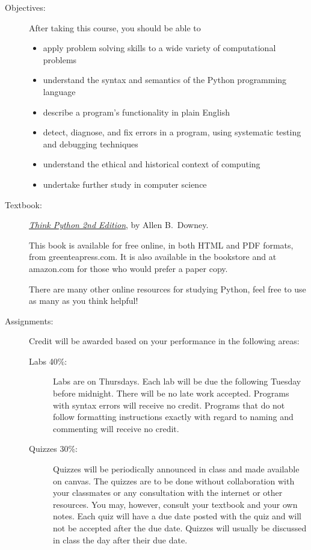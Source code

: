 \documentclass[12pt]{article}
\begin{document}
\begin{description}
\item[Objectives:] After taking this course, you should be 
able to
\begin{itemize}
\item apply problem solving skills to a wide variety of computational
problems
\item understand the syntax and semantics of the Python programming language
\item describe a program's functionality in plain English
\item detect, diagnose, and fix errors in a program,
using systematic testing and debugging techniques
\item understand the ethical and historical context of computing
\item undertake further study in computer science
\end{itemize}

\item[Textbook:]
\href{https://greenteapress.com/wp/think-python-2e/}
{\em Think Python 2nd Edition}, by Allen B.~Downey.

This book is available for free online, in both HTML and PDF
formats, from greenteapress.com.  
It is also available in the bookstore and at
amazon.com for those who would prefer a paper copy.

There are many other online resources for studying
Python, feel free to use as many as you think helpful!

\item[Assignments:] Credit will be awarded based on
your performance in the following areas:

\begin{description}
\item[Labs 40\%:] Labs are on Thursdays.  Each lab will be due
the following Tuesday before midnight.  There will be no
late work accepted.  Programs with syntax errors
will receive no credit.  Programs that do not follow
formatting instructions exactly with regard to
naming and commenting will receive no credit.

\item[Quizzes 30\%:] Quizzes will be periodically announced in
class and made available on canvas.  The quizzes are to 
be done without collaboration with your classmates
or any consultation with the internet or other resources.
You may, however, consult your textbook and your own notes.
Each quiz will have a due date posted with the quiz
and will not be accepted after the due date. Quizzes will
usually be discussed in class the day after their due date.


\end{description}
\end{description}
\end{document}
